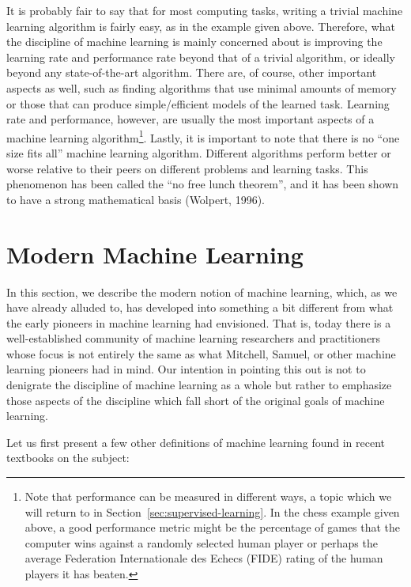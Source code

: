 It is probably fair to say that for most computing tasks, writing a trivial machine learning algorithm is fairly easy, as in the example given above. Therefore, what the discipline of machine learning is mainly concerned about is improving the learning rate and performance rate beyond that of a trivial algorithm, or ideally beyond any state-of-the-art algorithm. There are, of course, other important aspects as well, such as finding algorithms that use minimal amounts of memory or those that can produce simple/efficient models of the learned task. Learning rate and performance, however, are usually the most important aspects of a machine learning algorithm\footnote{Note that performance can be measured in different ways, a topic which we will return to in Section~\ref{sec:supervised-learning}. %
In the chess example given above, a good performance metric might be the percentage of games that the computer wins against a randomly selected human player or perhaps the average Federation Internationale des Echecs (FIDE) rating of the human players it has beaten.}. Lastly, it is important to note that there is no ``one size fits all'' machine learning algorithm. Different algorithms perform better or worse relative to their peers on different problems and learning tasks. This phenomenon has been called the ``no free lunch theorem'', and it has been shown to have a strong mathematical basis (Wolpert, 1996).

\section{Modern Machine Learning}
\label{sec:modern-machine-learning}

In this section, we describe the modern notion of machine learning, which, as we have already alluded to, has developed into something a bit different from what the early pioneers in machine learning had envisioned. That is, today there is a well-established community of machine learning researchers and practitioners whose focus is not entirely the same as what Mitchell, Samuel, or other machine learning pioneers had in mind. Our intention in pointing this out is not to denigrate the discipline of machine learning as a whole but rather to emphasize those aspects of the discipline which fall short of the original goals of machine learning. 

Let us first present a few other definitions of machine learning found in recent textbooks on the subject:

